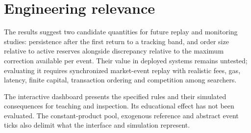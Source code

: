\section{Engineering relevance}

The results suggest two candidate quantities for future replay and monitoring studies: persistence after the first return to a tracking band, and order size relative to active reserves alongside discrepancy relative to the maximum correction available per event. Their value in deployed systems remains untested; evaluating it requires synchronized market-event replay with realistic fees, gas, latency, finite capital, transaction ordering and competition among searchers.

The interactive dashboard presents the specified rules and their simulated consequences for teaching and inspection. Its educational effect has not been evaluated. The constant-product pool, exogenous reference and abstract event ticks also delimit what the interface and simulation represent.
